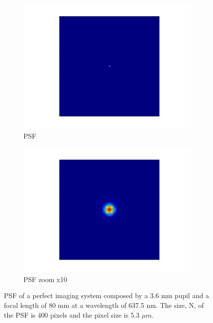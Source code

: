 \begin{figure}
\centering
    \begin{subfigure}{0.45\textwidth}
        \includegraphics[width=\textwidth]{Figures/PSF}
        \caption{PSF}
        \label{subfig:PSF}
    \end{subfigure}
    \quad
    \begin{subfigure}{0.45\textwidth}
        \includegraphics[width=\textwidth]{Figures/PSFzoom}
        \caption{PSF zoom x10}
        \label{subfig:PSFzoom}
    \end{subfigure}
    \decoRule
    \caption{PSF of a perfect imaging system composed by a 3.6 mm pupil and a focal length of 80 mm at a wavelength of 637.5 nm. The size, N, of the PSF is 400 pixels and the pixel size is 5.3 $\mu m$.}
    \label{fig:PSF}
\end{figure}

